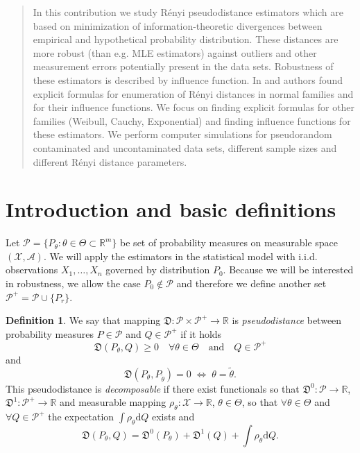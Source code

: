 \documentclass[11pt,a4paper]{article}
\theoremstyle{definition}
\newtheorem{definition}{Definition}[section]
\theoremstyle{theorem}
\newcommand{\iid}{i.i.d. }
\begin{document}
\begin{abstract}
In this contribution we study Rényi pseudodistance estimators which are based on minimization of information-theoretic divergences between empirical and hypothetical probability distribution. These distances are more robust (than e.g. MLE estimators) against outliers and other measurement errors potentially present in the data sets. Robustness of these estimators is described by influence function. In \cite{Vajda2009} and \cite{Demut2010} authors found explicit formulas for enumeration of Rényi distances in normal families and for their influence functions. We focus on finding explicit formulas for other families (Weibull, Cauchy, Exponential) and finding influence functions for these estimators. 
We perform computer simulations for pseudorandom contaminated and uncontaminated data sets, different sample sizes and different Rényi distance parameters. 
\end{abstract}

\section{Introduction and basic definitions}
Let $\mathcal{P} = \lbrace P_\theta : \theta \in \Theta \subset \mathbb{R}^m \rbrace$ be set of probability measures on measurable space $\left(\mathcal{X},\mathcal{A}\right)$.
We will apply the estimators in the statistical model with \iid observations $X_1,\ldots,X_n$ governed by distribution $P_0$. 
Because we will be interested in robustness, we allow the case $P_0 \notin \mathcal{P}$ and therefore we define another set $\mathcal{P}^+ = \mathcal{P} \cup \lbrace P_r \rbrace $.

\begin{definition}
	We say that mapping $\mathfrak{D}:\mathcal{P}\times\mathcal{P}^+ \rightarrow \mathbb{R}$ is \emph{pseudodistance} between probability measures $P \in \mathcal{P}$ and $Q \in \mathcal{P}^+$ if it holds
		\begin{equation}
			\mathfrak{D}(P_\theta,Q) \geq 0 \quad \forall \theta \in \Theta \quad \text{and} \quad Q \in \mathcal{P}^+
		\end{equation}
		and 
		\begin{equation}
			\mathfrak{D}(P_\theta,P_{\tilde{\theta}})=0 \; \Leftrightarrow \; \theta=\tilde{\theta}.
		\end{equation}
	This pseudodistance is \emph{ decomposable} if there exist functionals so that
		 $\mathfrak{D}^0:\mathcal{P}\rightarrow\mathbb{R}$, $ \mathfrak{D}^1:\mathcal{P}^+ \rightarrow \mathbb{R}$ and measurable mapping
		  $\rho_\theta : \mathcal{X} \rightarrow \mathbb{R}$, $ \theta \in \Theta$, so that $\forall \theta \in \Theta$ and $\forall Q \in \mathcal{P}^+$ the expectation $\int{\rho_\theta }\mathrm{d}Q$ exists and
		\begin{equation}
			\mathfrak{D} (P_\theta, Q) = \mathfrak{D}^0 (P_\theta) + \mathfrak{D}^1 (Q) + \int \rho_\theta \mathrm{d}Q.
		\end{equation}
\end{definition}
\end{document}
